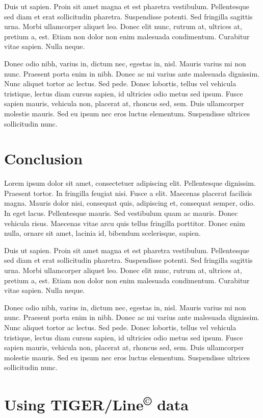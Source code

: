 \documentclass[11pt,letterpaper,onecolumn,twoside,openright,final]{report}
\begin{document}
Duis ut sapien.
Proin sit amet magna et est pharetra vestibulum.
Pellentesque sed diam et erat sollicitudin pharetra.
Suspendisse potenti.
Sed fringilla sagittis urna.
Morbi ullamcorper aliquet leo.
Donec elit nunc, rutrum at, ultrices at, pretium a, est.
Etiam non dolor non enim malesuada condimentum.
Curabitur vitae sapien.
Nulla neque.

Donec odio nibh, varius in, dictum nec, egestas in, nisl.
Mauris varius mi non nunc.
Praesent porta enim in nibh.
Donec ac mi varius ante malesuada dignissim.
Nunc aliquet tortor ac lectus.
Sed pede.
Donec lobortis, tellus vel vehicula tristique, lectus diam cursus sapien, id ultricies odio metus sed ipsum.
Fusce sapien mauris, vehicula non, placerat at, rhoncus sed, sem.
Duis ullamcorper molestie mauris.
Sed eu ipsum nec eros luctus elementum.
Suspendisse ultrices sollicitudin nunc.


\chapter{Conclusion}
Lorem ipsum dolor sit amet, consectetuer adipiscing elit. Pellentesque dignissim.
Praesent tortor.
In fringilla feugiat nisi.
Fusce a elit.
Maecenas placerat facilisis magna.
Mauris dolor nisi, consequat quis, adipiscing et, consequat semper, odio.
In eget lacus.
Pellentesque mauris.
Sed vestibulum quam ac mauris.
Donec vehicula risus.
Maecenas vitae arcu quis tellus fringilla porttitor.
Donec enim nulla, ornare sit amet, lacinia id, bibendum scelerisque, sapien.

Duis ut sapien.
Proin sit amet magna et est pharetra vestibulum.
Pellentesque sed diam et erat sollicitudin pharetra.
Suspendisse potenti.
Sed fringilla sagittis urna.
Morbi ullamcorper aliquet leo.
Donec elit nunc, rutrum at, ultrices at, pretium a, est.
Etiam non dolor non enim malesuada condimentum.
Curabitur vitae sapien.
Nulla neque.

Donec odio nibh, varius in, dictum nec, egestas in, nisl.
Mauris varius mi non nunc.
Praesent porta enim in nibh.
Donec ac mi varius ante malesuada dignissim.
Nunc aliquet tortor ac lectus.
Sed pede.
Donec lobortis, tellus vel vehicula tristique, lectus diam cursus sapien, id ultricies odio metus sed ipsum.
Fusce sapien mauris, vehicula non, placerat at, rhoncus sed, sem.
Duis ullamcorper molestie mauris.
Sed eu ipsum nec eros luctus elementum.
Suspendisse ultrices sollicitudin nunc.


\appendix
\chapter{Using TIGER/Line\textsuperscript{\scriptsize{\copyright}} data}
\vspace{0.5cm}
\end{document}
